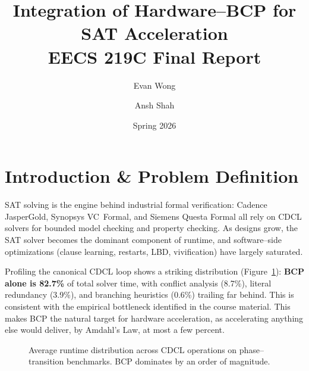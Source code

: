 \documentclass[11pt,letterpaper]{article}
\title{\textbf{Integration of Hardware--BCP for SAT Acceleration}\\
       \large EECS 219C Final Report}
\author{Evan Wong \and Ansh Shah\\}
\date{Spring 2026}
\begin{document}
\maketitle


\section{Introduction \& Problem Definition}
SAT solving is the engine behind industrial formal verification:
Cadence JasperGold, Synopsys VC~Formal, and Siemens Questa Formal all
rely on CDCL solvers for bounded model checking and property checking.
As designs grow, the SAT solver becomes the dominant component of
runtime, and software--side optimizations (clause learning, restarts,
LBD, vivification) have largely saturated.

Profiling the canonical CDCL loop shows a striking distribution
(Figure~\ref{fig:profile}): \textbf{BCP alone is 82.7\%} of total
solver time, with conflict analysis (8.7\%), literal redundancy
(3.9\%), and branching heuristics (0.6\%) trailing far behind.
This is consistent with the empirical bottleneck identified in the
course material. This
makes BCP the natural target for hardware acceleration, as accelerating
anything else would deliver, by Amdahl's Law, at most a few percent.

\begin{figure}[h]
\centering
{}
\caption{Average runtime distribution across CDCL operations on
phase--transition benchmarks. BCP dominates by an order of magnitude.}
\label{fig:profile}
\end{figure}
\end{document}
